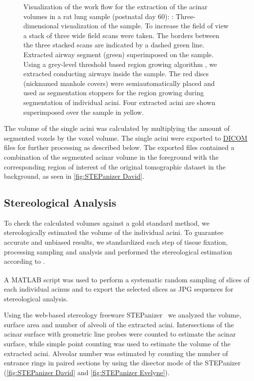 \documentclass[draft,a4paper,DIVcalc,abstract,english]{scrartcl}
\newlength\imagescale		%
\begin{document}
\begin{figure}
{\begin{tikzpicture}[x=\imagescale,y=-\imagescale]
		\end{tikzpicture}%
		\label{subfig:extracted acini}%
		}%
	\caption{%
		Visualization of the work flow for the extraction of the acinar volumes in a rat lung sample (postnatal day 60): %
		\protect{}: Three-dimensional visualization of the sample.
		To increase the field of view  a stack of three wide field scans were taken.
		The borders between the three stacked scans are indicated by a dashed green line. 
		\protect{} Extracted airway segment (green) superimposed on the sample.
		Using a grey-level threshold based region growing algorithm , we extracted conducting airways inside the sample.
		The red discs (nicknamed manhole covers) were semiautomatically placed and used as segmentation stoppers for the region growing during segmentation of individual acini.
		\protect{} Four extracted acini are shown superimposed over the sample in yellow.
	}
	\label{fig:workflow}
\end{figure}

The volume of the single acini was calculated by multiplying the amount of segmented voxels by the voxel volume.
The single acini were exported to \href{https://secure.wikimedia.org/wikipedia/en/w/index.php?title=Digital_Imaging_and_Communications_in_Medicine&oldid=415023605}{DICOM} files for further processing as described below.
The exported files contained a combination of the segmented acinar volume in the foreground with the corresponding region of interest of the original tomographic dataset in the background, as seen in \autoref{fig:STEPanizer David}.

\subsection{Stereological Analysis}
To check the calculated volumes against a gold standard method, we stereologically estimated the volume of the individual acini.
To guarantee accurate and unbiased results, we standardized each step of tissue fixation, processing sampling and analysis and performed the stereological estimation according to \citet{Hsia2010}.

A MATLAB\textsuperscript{\textregistered} script was used to perform a systematic random sampling of slices of each individual acinus and to export the selected slices as JPG sequences for stereological analysis.

Using the web-based stereology freeware STEPanizer~\cite[\url{http://stepanizer.com}]{Tschanz2011} we analyzed the volume, surface area and number of alveoli of the extracted acini.
Intersections of the acinar surface with geometric line probes were counted to estimate the acinar surface, while simple point counting was used to estimate the volume of the extracted acini.
Alveolar number was estimated by counting the number of entrance rings in paired sections by using the disector mode of the STEPanizer \citep{Hsia2010} (\autoref{fig:STEPanizer David} and \ref{fig:STEPanizer Evelyne}).
\end{document}
